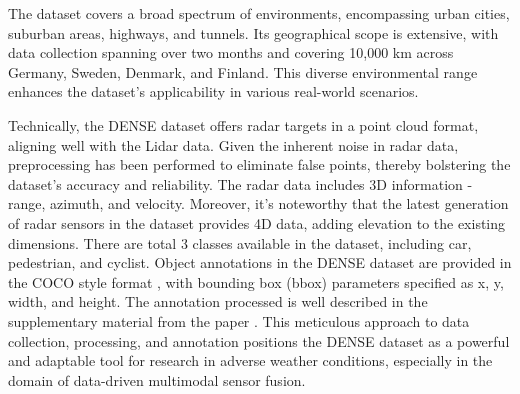 \documentclass[report.tex]{subfiles}
\begin{document}
    The dataset covers a broad spectrum of environments, encompassing urban cities, suburban areas, highways, and tunnels. Its geographical scope is extensive, with data collection spanning over two months and covering 10,000 km across Germany, Sweden, Denmark, and Finland. This diverse environmental range enhances the dataset's applicability in various real-world scenarios.

    Technically, the DENSE dataset offers radar targets in a point cloud format, aligning well with the Lidar data. Given the inherent noise in radar data, preprocessing has been performed to eliminate false points, thereby bolstering the dataset's accuracy and reliability. The radar data includes 3D information - range, azimuth, and velocity. Moreover, it's noteworthy that the latest generation of radar sensors in the dataset provides 4D data, adding elevation to the existing dimensions. There are total 3 classes available in the dataset, including car, pedestrian, and cyclist. Object annotations in the DENSE dataset are provided in the COCO style format \cite{lin2014microsoft}, with bounding box (bbox) parameters specified as x, y, width, and height. The annotation processed is well described in the supplementary material from the paper \cite{heide2023adverseweatherfusion}. This meticulous approach to data collection, processing, and annotation positions the DENSE dataset as a powerful and adaptable tool for research in adverse weather conditions, especially in the domain of data-driven multimodal sensor fusion.


\end{document}
